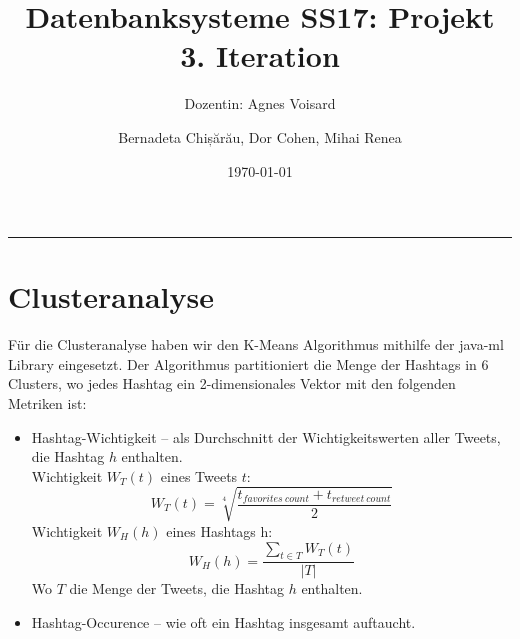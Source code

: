 \documentclass[paper=a4, english, ngerman, romanian]{scrartcl}
\begin{document}
\begin{titlepage}
	\title{Datenbanksysteme SS17: Projekt\\ 3. Iteration}	
	\subtitle{Dozentin: Agnes Voisard}
	\author{Bernadeta Chișărău, Dor Cohen, Mihai Renea}
	\date{\normalsize \today}
\end{titlepage}

\maketitle								%
\vspace*{-8cm}							%

\vspace{7cm}							%
\rule{\linewidth}{0.8pt}				%
	\section{Clusteranalyse}
		Für die Clusteranalyse haben wir den K-Means Algorithmus mithilfe der java-ml Library eingesetzt. Der Algorithmus partitioniert die Menge der Hashtags in 6 Clusters, wo jedes Hashtag ein 2-dimensionales Vektor mit den folgenden Metriken ist:
		\begin{itemize}
			\item Hashtag-Wichtigkeit -- als Durchschnitt der Wichtigkeitswerten aller Tweets, die Hashtag $h$ enthalten.\\
			Wichtigkeit $W_T(t)$ eines Tweets $t$:\\
			\begin{equation*}
				W_T(t) = \sqrt[4]{\frac{t_{favorites\ count} + t_{retweet\ count}}{2}}
			\end{equation*}
			Wichtigkeit $W_H(h)$ eines Hashtags h:
			\begin{equation*}
				W_H(h) = \frac{\sum_{t \in T} W_T(t)}{|T|}
			\end{equation*}
			Wo $T$ die Menge der Tweets, die Hashtag $h$ enthalten.
			
			\item Hashtag-Occurence -- wie oft ein Hashtag insgesamt auftaucht.
		\end{itemize}
		
\end{document}
